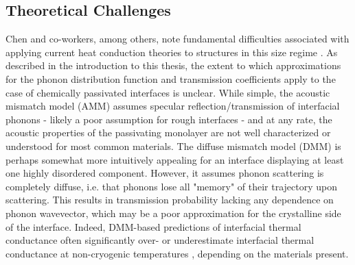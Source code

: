 \subsection{Theoretical Challenges}

Chen and co-workers, among others, note fundamental difficulties associated with applying current heat conduction theories to structures in this size regime \cite{chen2000particularities}. As described in the introduction to this thesis, the extent to which approximations for the phonon distribution function and transmission coefficients apply to the case of chemically passivated interfaces is unclear. While simple, the acoustic mismatch model (AMM) assumes specular reflection/transmission of interfacial phonons - likely a poor assumption for rough interfaces \cite{chen2000particularities} - and at any rate, the acoustic properties of the passivating monolayer are not well characterized or understood for most common materials. The diffuse mismatch model (DMM) is perhaps somewhat more intuitively appealing for an interface displaying at least one highly disordered component. However, it assumes phonon scattering is completely diffuse, i.e. that phonons lose all "memory" of their trajectory upon scattering. This results in transmission probability lacking any dependence on phonon wavevector, which may be a poor approximation for the crystalline side of the interface. Indeed, DMM-based predictions of interfacial thermal conductance often significantly over- or underestimate interfacial thermal conductance at non-cryogenic temperatures \cite{yang2015thermal, duda2009extension}, depending on the materials present. \par

